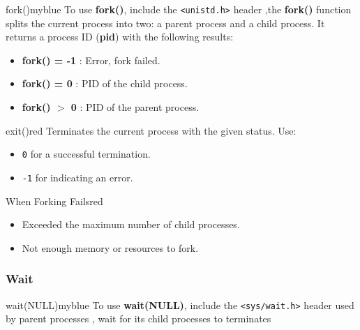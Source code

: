 \begin{prettyBox}{fork()}{myblue}
To use \textbf{fork()}, include the \texttt{<unistd.h>} header  
,the \textbf{fork()} function splits the current process into two: a parent process and a child process. It returns a process ID (\textbf{pid}) with the following results:
\begin{itemize}
    \item \textbf{fork() = -1} : Error, fork failed.
    \item \textbf{fork() = 0} : PID of the child process.
    \item \textbf{fork() \(>\) 0} : PID of the parent process.
\end{itemize}
\end{prettyBox}

\newpage
\null




\vspace{0.5cm}

\begin{prettyBox}{exit()}{red}
    Terminates the current process with the given status. Use:
    \begin{itemize}
        \item \texttt{0} for a successful termination.
        \item \texttt{-1} for indicating an error.
    \end{itemize}
\end{prettyBox}

\vspace{0.35cm}

\begin{prettyBox}{When Forking Fails}{red}
    \begin{itemize}
        \item Exceeded the maximum number of child processes.
        \item Not enough memory or resources to fork.
    \end{itemize}
\end{prettyBox}

\vspace{0.35cm}

\subsubsection{Wait}
\begin{prettyBox}{wait(NULL)}{myblue}
To use \textbf{wait(NULL)}, include the \texttt{<sys/wait.h>} header used by parent processes , wait for its child processes to terminates
\end{prettyBox}

